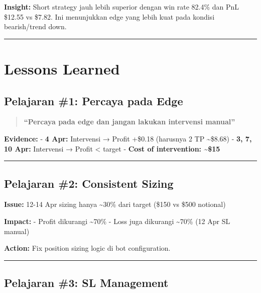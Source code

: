 \documentclass[
  11pt,
  a4paper,
]{article}
\begin{document}
\textbf{Insight:} Short strategy jauh lebih superior dengan win rate
82.4\% dan PnL \$12.55 vs \$7.82. Ini menunjukkan edge yang lebih kuat
pada kondisi bearish/trend down.

\begin{center}\rule{0.5\linewidth}{0.5pt}\end{center}

\section{Lessons Learned}\label{lessons-learned}

\subsection{Pelajaran \#1: Percaya pada
Edge}\label{pelajaran-1-percaya-pada-edge}

\begin{quote}
\textbf{``Percaya pada edge dan jangan lakukan intervensi manual''}
\end{quote}

\textbf{Evidence:} - \textbf{4 Apr:} Intervensi → Profit +\$0.18
(harusnya 2 TP \textasciitilde\$8.68) - \textbf{3, 7, 10 Apr:}
Intervensi → Profit \textless{} target - \textbf{Cost of intervention:
\textasciitilde\$15}

\begin{center}\rule{0.5\linewidth}{0.5pt}\end{center}

\subsection{Pelajaran \#2: Consistent
Sizing}\label{pelajaran-2-consistent-sizing}

\textbf{Issue:} 12-14 Apr sizing hanya \textasciitilde30\% dari target
(\$150 vs \$500 notional)

\textbf{Impact:} - Profit dikurangi \textasciitilde70\% - Loss juga
dikurangi \textasciitilde70\% (12 Apr SL manual)

\textbf{Action:} Fix position sizing logic di bot configuration.

\begin{center}\rule{0.5\linewidth}{0.5pt}\end{center}

\subsection{Pelajaran \#3: SL
Management}\label{pelajaran-3-sl-management}
\end{document}
